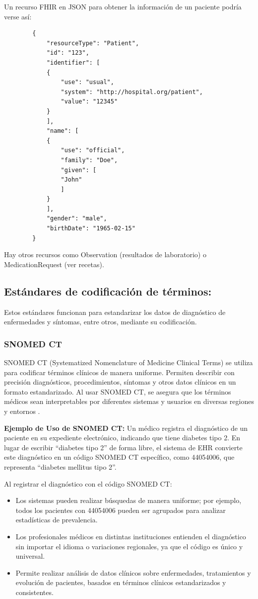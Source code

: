 \documentclass[12pt, a4paper, twoside]{article}
\begin{document}
	
	Un recurso FHIR en JSON para obtener la información de un paciente podría verse así:
	
	\begin{verbatim}
		{
			"resourceType": "Patient",
			"id": "123",
			"identifier": [
			{
				"use": "usual",
				"system": "http://hospital.org/patient",
				"value": "12345"
			}
			],
			"name": [
			{
				"use": "official",
				"family": "Doe",
				"given": [
				"John"
				]
			}
			],
			"gender": "male",
			"birthDate": "1965-02-15"
		}
	\end{verbatim}
	
	Hay otros recursos como Observation (resultados de laboratorio) o MedicationRequest (ver recetas).
	
	\subsection{Estándares de codificación de términos:}
	
	Estos estándares funcionan para estandarizar los datos de diagnóstico de enfermedades y síntomas, entre otros, mediante su codificación.
	
	\subsubsection{SNOMED CT}
	
	SNOMED CT (Systematized Nomenclature of Medicine Clinical Terms) se utiliza para codificar términos clínicos de manera uniforme. Permiten describir con precisión diagnósticos, procedimientos, síntomas y otros datos clínicos en un formato estandarizado. Al usar SNOMED CT, se asegura que los términos médicos sean interpretables por diferentes sistemas y usuarios en diversas regiones y entornos \cite{sanidadSNOMEDCT}.
	
	\textbf{Ejemplo de Uso de SNOMED CT:} Un médico registra el diagnóstico de un paciente en su expediente electrónico, indicando que tiene diabetes tipo 2. En lugar de escribir “diabetes tipo 2” de forma libre, el sistema de EHR convierte este diagnóstico en un código SNOMED CT específico, como 44054006, que representa “diabetes mellitus tipo 2”\cite{bioportalSNOMEDCT}.
	
	Al registrar el diagnóstico con el código SNOMED CT:
	
	\begin{itemize}
		\item Los sistemas pueden realizar búsquedas de manera uniforme; por ejemplo, todos los pacientes con 44054006 pueden ser agrupados para analizar estadísticas de prevalencia.
		
		\item Los profesionales médicos en distintas instituciones entienden el diagnóstico sin importar el idioma o variaciones regionales, ya que el código es único y universal.
		
		\item Permite realizar análisis de datos clínicos sobre enfermedades, tratamientos y evolución de pacientes, basados en términos clínicos estandarizados y consistentes.
	\end{itemize}
	
\end{document}
